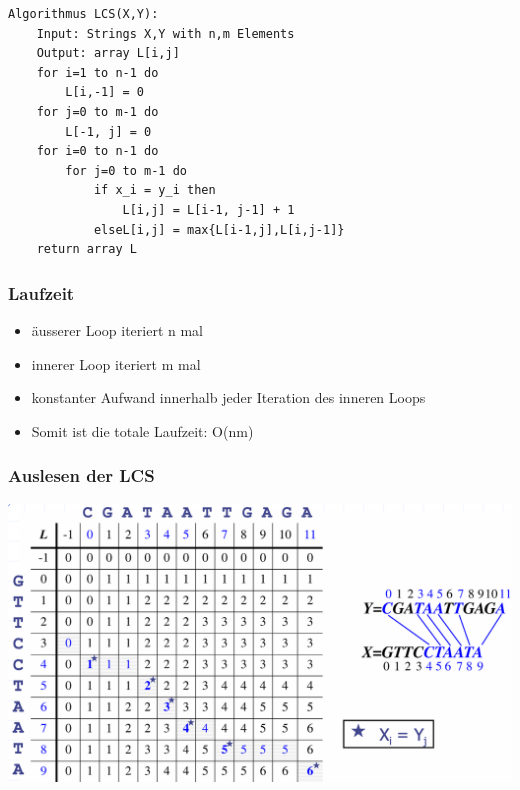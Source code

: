 \begin{lstlisting}
Algorithmus LCS(X,Y):
    Input: Strings X,Y with n,m Elements
    Output: array L[i,j]
    for i=1 to n-1 do
        L[i,-1] = 0
    for j=0 to m-1 do
        L[-1, j] = 0
    for i=0 to n-1 do
        for j=0 to m-1 do
            if x_i = y_i then
                L[i,j] = L[i-1, j-1] + 1
            elseL[i,j] = max{L[i-1,j],L[i,j-1]}
    return array L
\end{lstlisting}

\subsubsection{Laufzeit}
\begin{itemize}
    \item äusserer Loop iteriert n mal
    \item innerer Loop iteriert m mal
    \item konstanter Aufwand innerhalb jeder Iteration des inneren Loops
    \item Somit ist die totale Laufzeit: O(nm)
\end{itemize}

\subsubsection{Auslesen der LCS}
\begin{center}
    \includegraphics[scale=.2]{graphic/10 DynamicProgramming/Auslesen der LCS.png}
\end{center}

\newpage